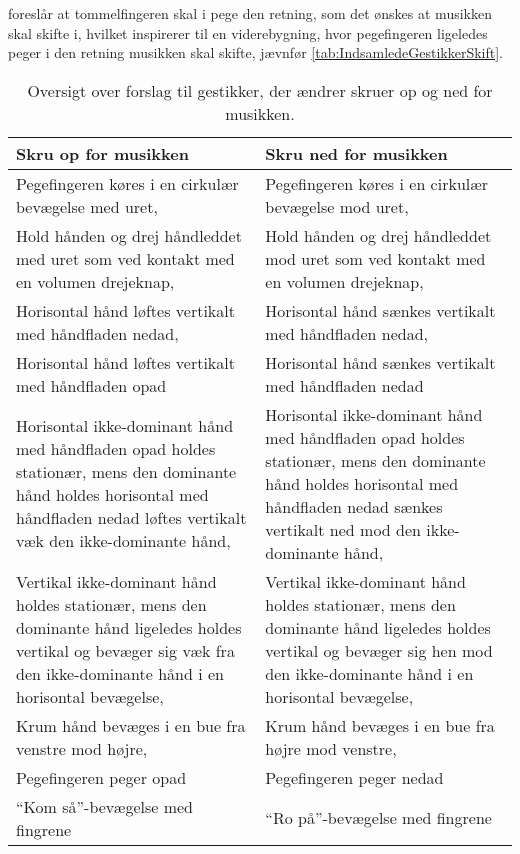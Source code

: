 \textcite[s. 166]{PDF:ComparingInputModalities} foreslår at tommelfingeren skal i pege den retning, som det ønskes at musikken skal skifte i, hvilket inspirerer til en viderebygning, hvor pegefingeren ligeledes peger i den retning musikken skal skifte, jævnfør \autoref{tab:IndsamledeGestikkerSkift}.            
%
\begin{table}[H]
	\centering
	\begin{tabular}{| p{6cm} | p{6cm} |}
		\hline
		\textbf{Skru op for musikken} & \textbf{Skru ned for musikken} \\ \hline
		Pegefingeren køres i en cirkulær bevægelse med uret, \parencite{WEB:BeosoundMoment, WEB:BMW7} & Pegefingeren køres i en cirkulær bevægelse mod uret, \parencite{WEB:BeosoundMoment, WEB:BMW7} \\ \hline
		Hold hånden og drej håndleddet med uret som ved kontakt med en volumen drejeknap, \parencite{WEB:Beosound2} & Hold hånden og drej håndleddet mod uret som ved kontakt med en volumen drejeknap, \parencite{WEB:Beosound2} \\ \hline
		Horisontal hånd løftes vertikalt med håndfladen nedad, \parencite[s. 166]{PDF:ComparingInputModalities} & Horisontal hånd sænkes vertikalt med håndfladen nedad, \parencite[s. 166]{PDF:ComparingInputModalities} \\ \hline
		Horisontal hånd løftes vertikalt med håndfladen opad & Horisontal hånd sænkes vertikalt med håndfladen nedad \\ \hline
		Horisontal ikke-dominant hånd med håndfladen opad holdes stationær, mens den dominante hånd holdes horisontal med håndfladen nedad løftes vertikalt væk den ikke-dominante hånd, \parencite[s. 48]{PDF:UserDefinedGesturesTV} & Horisontal ikke-dominant hånd med håndfladen opad holdes stationær, mens den dominante hånd holdes horisontal med håndfladen nedad sænkes vertikalt ned mod den ikke-dominante hånd, \parencite[s. 48]{PDF:UserDefinedGesturesTV} \\ \hline
		Vertikal ikke-dominant hånd holdes stationær, mens den dominante hånd ligeledes holdes vertikal og bevæger sig væk fra den ikke-dominante hånd i en horisontal bevægelse, \parencite[s. 48]{PDF:UserDefinedGesturesTV} & Vertikal ikke-dominant hånd holdes stationær, mens den dominante hånd ligeledes holdes vertikal og bevæger sig hen mod den ikke-dominante hånd i en horisontal bevægelse, \parencite[s. 48]{PDF:UserDefinedGesturesTV} \\ \hline
		Krum hånd bevæges i en bue fra venstre mod højre, \parencite{WEB:BeoplayA9} & Krum hånd bevæges i en bue fra højre mod venstre, \parencite{WEB:BeoplayA9} \\ \hline
		Pegefingeren peger opad & Pegefingeren peger nedad \\ \hline
		\enquote{Kom så}-bevægelse med fingrene & \enquote{Ro på}-bevægelse med fingrene \\ \hline		
	\end{tabular}
	\caption{Oversigt over forslag til gestikker, der ændrer skruer op og ned for musikken.}
	\label{tab:IndsamledeGestikkerVolumen}
\end{table}
